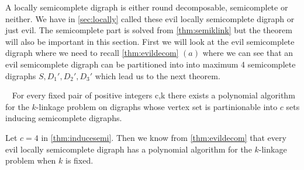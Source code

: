 A locally semicomplete digraph is either round decomposable, semicomplete or neither.
We have in \autoref{sec:locally} called these evil locally semicomplete digraph or just evil.
The semicomplete part is solved from \autoref{thm:semiklink} but the theorem will also be important in this section.
First we will look at the evil semicomplete digraph where we need to recall \autoref{thm:evildecom} $(a)$ where we can see that an evil semicomplete digraph can be partitioned into into maximum 4 semicomplete digraphs $S,D_1',D_2',D_3'$ which lead us to the next theorem.
\begin{thm}~\cite{chudnovskyJCT135}
    For every fixed pair of positive integers c,k there exists a polynomial algorithm for the $k$-linkage problem on digraphs whose vertex set is partinionable into $c$ sets inducing semicomplete digraphs.
    \label{thm:inducesemi}
\end{thm}
Let $c=4$ in \autoref{thm:inducesemi}. 
Then we know from \autoref{thm:evildecom} that every evil locally semicomplete digraph has a polynomial algorithm for the $k$-linkage problem when $k$ is fixed.\\

